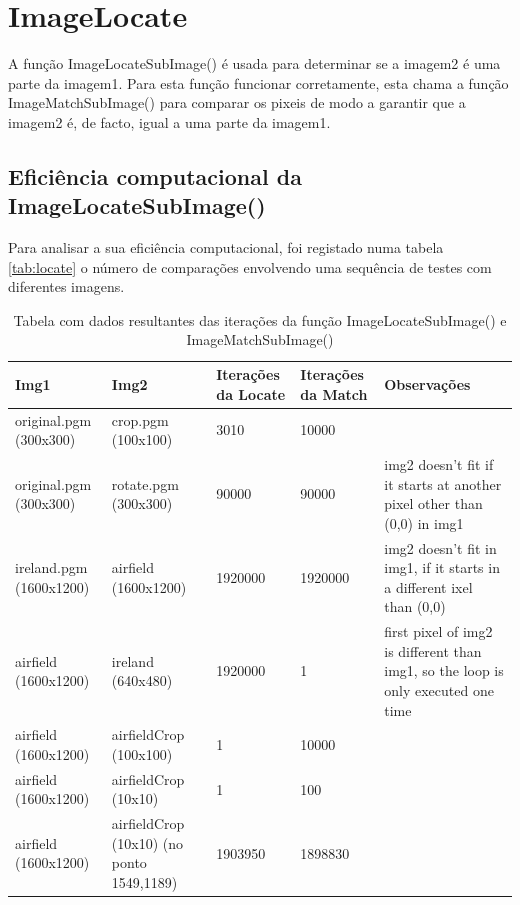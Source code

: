 \section{ImageLocate}\label{sec:imagelocate}
\fontsize{12}{12}\selectfont
    \par A função ImageLocateSubImage() é usada para determinar se a imagem2 é uma parte da imagem1.
        Para esta função funcionar corretamente, esta chama a função ImageMatchSubImage() para comparar os pixeis 
        de modo a garantir que a imagem2 é, de facto, igual a uma parte da imagem1.

\subsection{Eficiência computacional da ImageLocateSubImage()}
    \par Para analisar a sua eficiência computacional, foi registado numa tabela \autoref{tab:locate} o 
    número de comparações envolvendo uma sequência de testes com diferentes imagens. 

\begin{center}
    \begin{table}[h]
        \centering
        \begin{tabular}{| p{2cm} | p{3cm} | p{1.5cm} | p{2cm} | p{5cm} |}
        \hline
        \textbf{Img1} & \textbf{Img2} & \textbf{Iterações da Locate} & \textbf{Iterações da Match} & \textbf{Observações} \\ \hline
        original.pgm (300x300) & crop.pgm (100x100) & 3010 & 10000 & \\ \hline
        original.pgm (300x300) & rotate.pgm (300x300) & 90000 & 90000 & 
            img2 doesn't fit if it starts at another pixel other than (0,0) in img1 \\ \hline
        ireland.pgm (1600x1200) & airfield (1600x1200) & 1920000 & 1920000 &
            img2 doesn't fit in img1, if it starts in a different ixel than (0,0)  \\ \hline
        airfield (1600x1200) & ireland (640x480) & 1920000 & 1 &
            first pixel of img2 is different than img1, so the loop is only executed one time \\ \hline
        airfield (1600x1200) & airfieldCrop (100x100) & 1 & 10000 &  \\ \hline
        airfield (1600x1200) & airfieldCrop (10x10)  & 1 & 100 & \\ \hline
        airfield (1600x1200) & airfieldCrop (10x10) (no ponto 1549,1189) & 1903950 & 1898830 & \\ \hline                 
        \end{tabular}
        \caption{Tabela com dados resultantes das iterações da função ImageLocateSubImage() e ImageMatchSubImage()}
        \label{tab:locate}
    \end{table}
\end{center}

